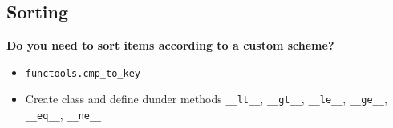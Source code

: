 \documentclass[12pt]{article}
\begin{document}
\subsection*{Sorting}

\begin{adjustwidth}{2em}{0pt}
\textbf{Do you need to sort items according to a custom scheme?}
\begin{itemize}
  \item \texttt{functools.cmp\_to\_key} 
  \item Create class and define dunder methods \texttt{\_\_lt\_\_}, \texttt{\_\_gt\_\_}, \texttt{\_\_le\_\_}, \texttt{\_\_ge\_\_}, \texttt{\_\_eq\_\_}, \texttt{\_\_ne\_\_}
\end{itemize}
\end{adjustwidth}
\bigskip
\end{document}
